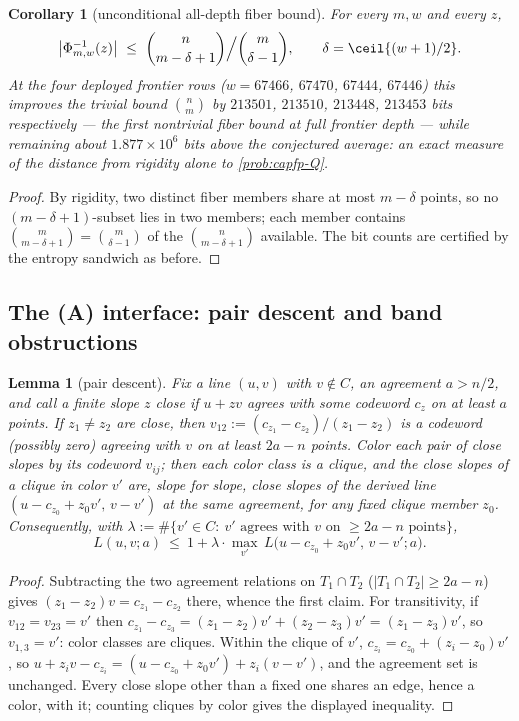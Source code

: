\documentclass[11pt]{article}
\newtheorem{lemma}[lemma]{Lemma}
\newtheorem{corollary}[corollary]{Corollary}
\theoremstyle{definition}
\theoremstyle{remark}
\begin{document}
\begin{corollary}[unconditional all-depth fiber bound]\label{cor:capfp-packing}
For every $m,w$ and every $z$,
\[
        \bigl|\Phi_{m,w}^{-1}(z)\bigr|\ \le\ \binom{n}{m-\delta+1}\Big/\binom{m}{\delta-1},
        \qquad \delta=\ceil{(w+1)/2}.
\]
At the four deployed frontier rows \textup($w=67466$, $67470$, $67444$, $67446$\textup) this improves the trivial bound $\binom nm$ by $213501$, $213510$, $213448$, $213453$ bits respectively --- the first nontrivial fiber bound at full frontier depth --- while remaining about $1.877\times10^6$ bits above the conjectured average: an exact measure of the distance from rigidity alone to \cref{prob:capfp-Q}.
\end{corollary}

\begin{proof}
By rigidity, two distinct fiber members share at most $m-\delta$ points, so no $(m-\delta+1)$-subset lies in two members; each member contains $\binom m{m-\delta+1}=\binom m{\delta-1}$ of the $\binom n{m-\delta+1}$ available.  The bit counts are certified by the entropy sandwich as before.
\end{proof}

\subsection{The \textup{(A)} interface: pair descent and band obstructions}

\begin{lemma}[pair descent]\label{lem:capfp-pair-descent}
Fix a line $(u,v)$ with $v\notin C$, an agreement $a>n/2$, and call a finite slope $z$ \emph{close} if $u+zv$ agrees with some codeword $c_z$ on at least $a$ points.  If $z_1\ne z_2$ are close, then $v_{12}:=(c_{z_1}-c_{z_2})/(z_1-z_2)$ is a codeword \textup(possibly zero\textup) agreeing with $v$ on at least $2a-n$ points.  Color each pair of close slopes by its codeword $v_{ij}$; then each color class is a clique, and the close slopes of a clique in color $v'$ are, slope for slope, close slopes of the derived line $(u-c_{z_0}+z_0v',\,v-v')$ at the same agreement, for any fixed clique member $z_0$.  Consequently, with $\lambda:=\#\{v'\in C:\ v'\text{ agrees with }v\text{ on }\ge2a-n\text{ points}\}$,
\[
        L(u,v;a)\ \le\ 1+\lambda\cdot\max_{v'}\,L\bigl(u-c_{z_0}+z_0v',\,v-v';a\bigr).
\]
\end{lemma}

\begin{proof}
Subtracting the two agreement relations on $T_1\cap T_2$ \textup($|T_1\cap T_2|\ge2a-n$\textup) gives $(z_1-z_2)v=c_{z_1}-c_{z_2}$ there, whence the first claim.  For transitivity, if $v_{12}=v_{23}=v'$ then $c_{z_1}-c_{z_3}=(z_1-z_2)v'+(z_2-z_3)v'=(z_1-z_3)v'$, so $v_{1,3}=v'$: color classes are cliques.  Within the clique of $v'$, $c_{z_i}=c_{z_0}+(z_i-z_0)v'$, so $u+z_iv-c_{z_i}=(u-c_{z_0}+z_0v')+z_i(v-v')$, and the agreement set is unchanged.  Every close slope other than a fixed one shares an edge, hence a color, with it; counting cliques by color gives the displayed inequality.
\end{proof}
\end{document}
